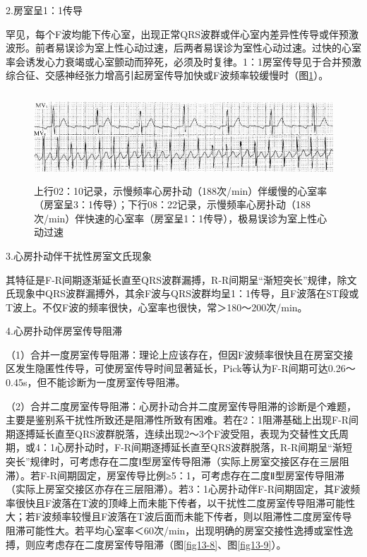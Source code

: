 2.房室呈1：1传导

罕见，每个F波均能下传心室，出现正常QRS波群或伴心室内差异性传导或伴预激波形。前者易误诊为室上性心动过速，后两者易误诊为室性心动过速。过快的心室率会诱发心力衰竭或心室颤动而猝死，必须及时复律。1：1房室传导见于合并预激综合征、交感神经张力增高引起房室传导加快或F波频率较缓慢时（图\ref{fig13-7}）。

\begin{figure}[!htbp]
 \centering
 \includegraphics[width=5.58333in,height=1.30208in]{./images/Image00215.jpg}
 \captionsetup{justification=centering}
 \caption{上行02：10记录，示慢频率心房扑动（188次/min）伴缓慢的心室率（房室呈3：1传导）；下行08：22记录，示慢频率心房扑动（188次/min）伴快速的心室率（房室呈1：1传导），极易误诊为室上性心动过速}
 \label{fig13-7}
  \end{figure} 

3.心房扑动伴干扰性房室文氏现象

其特征是F-R间期逐渐延长直至QRS波群漏搏，R-R间期呈“渐短突长”规律，除文氏现象中QRS波群漏搏外，其余F波与QRS波群均呈1：1传导，且F波落在ST段或T波上。不仅F波的频率很快，心室率也很快，常＞180～200次/min。

4.心房扑动伴房室传导阻滞

（1）合并一度房室传导阻滞：理论上应该存在，但因F波频率很快且在房室交接区发生隐匿性传导，可使房室传导时间显著延长，Pick等认为F-R间期可达0.26～0.45s，但不能诊断为一度房室传导阻滞。

（2）合并二度房室传导阻滞：心房扑动合并二度房室传导阻滞的诊断是个难题，主要是鉴别系干扰性所致还是阻滞性所致有困难。若在2：1阻滞基础上出现F-R间期逐搏延长直至QRS波群脱落，连续出现2～3个F波受阻，表现为交替性文氏周期，或4：1心房扑动时，F-R间期逐搏延长直至QRS波群脱落，R-R间期呈“渐短突长”规律时，可考虑存在二度Ⅰ型房室传导阻滞（实际上房室交接区存在三层阻滞）。若F-R间期固定，房室传导比例≥5：1，可考虑存在二度Ⅱ型房室传导阻滞（实际上房室交接区亦存在三层阻滞）。若3：1心房扑动伴F-R间期固定，其F波频率很快且F波落在T波的顶峰上而未能下传者，以干扰性二度房室传导阻滞可能性大；若F波频率较慢且F波落在T波后面而未能下传者，则以阻滞性二度房室传导阻滞可能性大。若平均心室率＜60次/min，出现明确的房室交接性逸搏或室性逸搏，则应考虑存在二度房室传导阻滞（图\ref{fig13-8}、图\ref{fig13-9}）。


